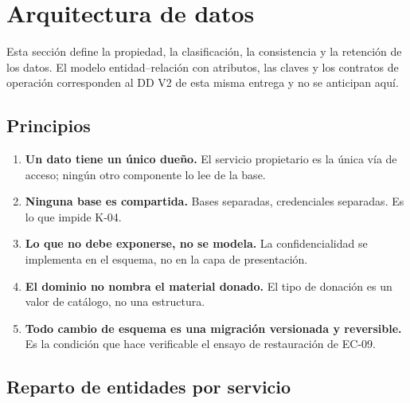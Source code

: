 \documentclass[11pt,a4paper]{article}
\begin{document}
\section{Arquitectura de datos}
\label{sec:datos}

Esta sección define la propiedad, la clasificación, la consistencia y la retención de los datos. El modelo entidad--relación con atributos, las claves y los contratos de operación corresponden al DD V2 de esta misma entrega y no se anticipan aquí.

\subsection{Principios}

\begin{enumerate}
\item \textbf{Un dato tiene un único dueño.} El servicio propietario es la única vía de acceso; ningún otro componente lo lee de la base.
\item \textbf{Ninguna base es compartida.} Bases separadas, credenciales separadas. Es lo que impide K-04.
\item \textbf{Lo que no debe exponerse, no se modela.} La confidencialidad se implementa en el esquema, no en la capa de presentación.
\item \textbf{El dominio no nombra el material donado.} El tipo de donación es un valor de catálogo, no una estructura.
\item \textbf{Todo cambio de esquema es una migración versionada y reversible.} Es la condición que hace verificable el ensayo de restauración de EC-09.
\end{enumerate}

\subsection{Reparto de entidades por servicio}
\end{document}
